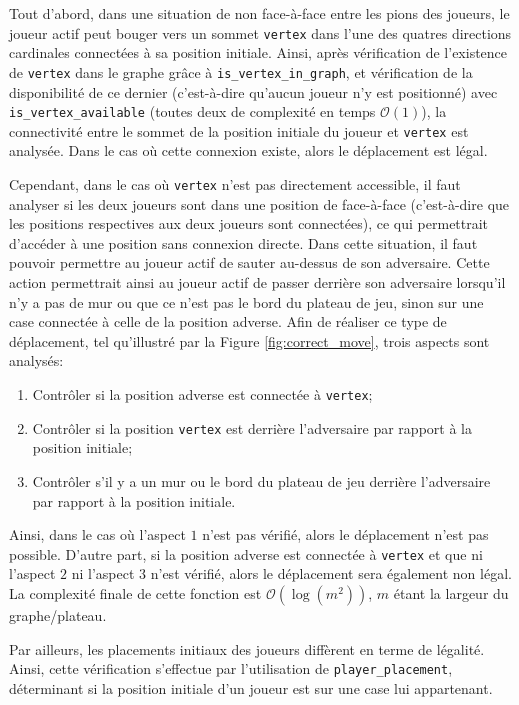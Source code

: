 \documentclass[11pt]{article}
\begin{document}
Tout d'abord, dans une situation de non face-à-face entre les pions des joueurs, le joueur actif peut bouger vers un sommet \texttt{vertex} dans l'une des quatres directions cardinales connectées à sa position initiale. Ainsi, après vérification de l'existence de \texttt{vertex} dans le graphe grâce à \texttt{is\_vertex\_in\_graph}, et vérification de la disponibilité de ce dernier (c'est-à-dire qu'aucun joueur n'y est positionné) avec \texttt{is\_vertex\_available} (toutes deux de complexité en temps $\mathcal{O}(1)$), la connectivité entre le sommet de la position initiale du joueur et \texttt{vertex} est analysée. Dans le cas où cette connexion existe, alors le déplacement est légal.

Cependant, dans le cas où \texttt{vertex} n'est pas directement accessible, il faut analyser si les deux joueurs sont dans une position de face-à-face (c'est-à-dire que les positions respectives aux deux joueurs sont connectées), ce qui permettrait d'accéder à une position sans connexion directe. Dans cette situation, il faut pouvoir permettre au joueur actif de sauter au-dessus de son adversaire. Cette action permettrait ainsi au joueur actif de passer derrière son adversaire lorsqu'il n'y a pas de mur ou que ce n'est pas le bord du plateau de jeu, sinon sur une case connectée à celle de la position adverse. Afin de réaliser ce type de déplacement, tel qu'illustré par la Figure \ref{fig:correct_move}, trois aspects sont analysés:
\begin{enumerate}
    \item Contrôler si la position adverse est connectée à \texttt{vertex};
    \item Contrôler si la position \texttt{vertex} est derrière l'adversaire par rapport à la position initiale;
    \item Contrôler s'il y a un mur ou le bord du plateau de jeu derrière l'adversaire par rapport à la position initiale.
\end{enumerate}

Ainsi, dans le cas où l'aspect $1$ n'est pas vérifié, alors le déplacement n'est pas possible. D'autre part, si la position adverse est connectée à \texttt{vertex} et que ni l'aspect $2$ ni l'aspect $3$ n'est vérifié, alors le déplacement sera également non légal. La complexité finale de cette fonction est $\mathcal{O}(\log(m^{2}))$, $m$ étant la largeur du graphe/plateau.

Par ailleurs, les placements initiaux des joueurs diffèrent en terme de légalité. Ainsi, cette vérification s'effectue par l'utilisation de \texttt{player\_placement}, déterminant si la position initiale d'un joueur est sur une case lui appartenant.
\end{document}
